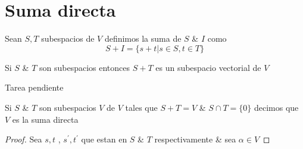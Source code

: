 \newpage
\section{Suma directa}
\begin{definicion}
	Sean $S,T$ subespacios de $V$ definimos la suma de $S$ \& $I$ como 
	\begin{equation}
		S + I = \{ s + t | s \in S , t \in T \} \nonumber 
	\end{equation}
\end{definicion}

\begin{proposicion}
	 Si $S$ \& $T$ son subespacios entonces $S+T$ es un subespacio vectorial de $V$
\end{proposicion}

Tarea pendiente 
\begin{definicion}
	 Si $S$ \& $T$ son subespacios $V$ de $V$ tales que $S+T=V$ \& $S \cap T = \{ 0 \} $ decimos que $V$ es la suma directa  
 \end{definicion} 

 \begin{proof}
 	Sea $s,t$ , $ s^\prime , t^\prime $ que estan en $S$ \& $T$ respectivamente \& sea $\alpha \in V$   
 \end{proof}